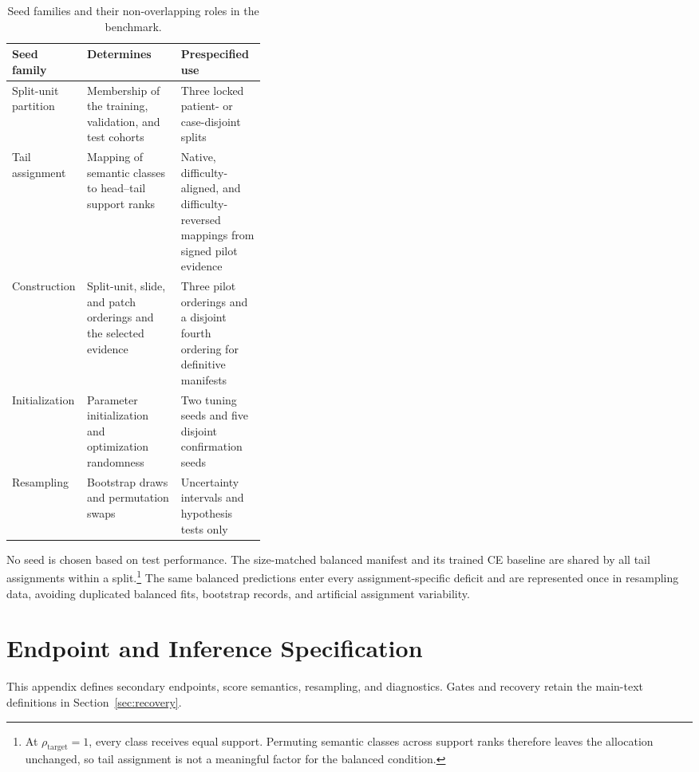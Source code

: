 \documentclass[11pt]{article}
\begin{document}
\begin{table}[H]
  \centering
  \footnotesize
  \begin{tabularx}{\linewidth}{@{}l>{\raggedright\arraybackslash}p{0.37\linewidth}>{\raggedright\arraybackslash}X@{}}
    \toprule
    Seed family & Determines & Prespecified use \\
    \midrule
    Split-unit partition & Membership of the training, validation, and test cohorts & Three locked patient- or case-disjoint splits \\
    Tail assignment & Mapping of semantic classes to head--tail support ranks & Native, difficulty-aligned, and difficulty-reversed mappings from signed pilot evidence \\
    Construction & Split-unit, slide, and patch orderings and the selected evidence & Three pilot orderings and a disjoint fourth ordering for definitive manifests \\
    Initialization & Parameter initialization and optimization randomness & Two tuning seeds and five disjoint confirmation seeds \\
    Resampling & Bootstrap draws and permutation swaps & Uncertainty intervals and hypothesis tests only \\
    \bottomrule
  \end{tabularx}
  \caption{Seed families and their non-overlapping roles in the benchmark.}
  \label{tab:seed-families}
\end{table}

\noindent No seed is chosen based on test performance. The size-matched balanced manifest and its trained CE baseline are shared by all tail assignments within a split.\footnote{At $\rho_{\mathrm{target}}=1$, every class receives equal support. Permuting semantic classes across support ranks therefore leaves the allocation unchanged, so tail assignment is not a meaningful factor for the balanced condition.} The same balanced predictions enter every assignment-specific deficit and are represented once in resampling data, avoiding duplicated balanced fits, bootstrap records, and artificial assignment variability.

\section{Endpoint and Inference Specification}
\label{app:endpoints}
This appendix defines secondary endpoints, score semantics, resampling, and diagnostics. Gates and recovery retain the main-text definitions in Section~\ref{sec:recovery}.
\end{document}
